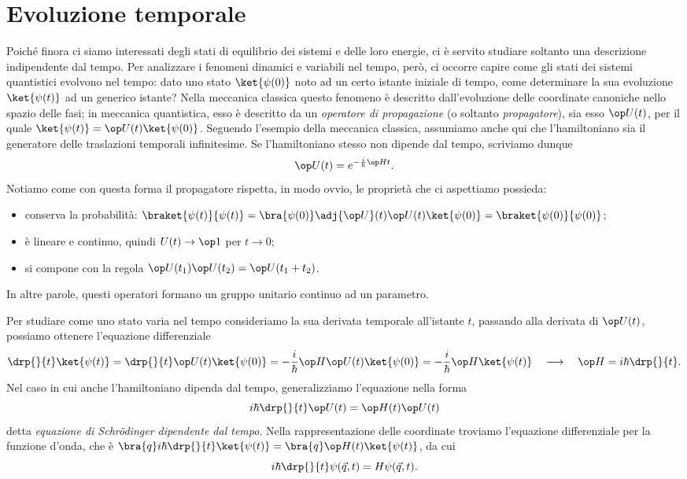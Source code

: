 \chapter{Evoluzione temporale}
Poich\'e finora ci siamo interessati degli stati di equilibrio dei sistemi  e delle loro energie, ci è servito studiare soltanto una descrizione indipendente dal tempo.
Per analizzare i fenomeni dinamici e variabili nel tempo, però, ci occorre capire come gli stati dei sistemi quantistici evolvono nel tempo: dato uno stato $\ket{\psi(0)}$ noto ad un certo istante iniziale di tempo, come determinare la sua evoluzione $\ket{\psi(t)}$ ad un generico istante?
Nella meccanica classica questo fenomeno è descritto dall'evoluzione delle coordinate canoniche nello spazio delle fasi; in meccanica quantistica, esso è descritto da un \emph{operatore di propagazione} (o soltanto \emph{propagatore}), sia esso $\op U(t)$, per il quale $\ket{\psi(t)}=\op U(t)\ket{\psi(0)}$.
Seguendo l'esempio della meccanica classica, assumiamo anche qui che l'hamiltoniano sia il generatore delle traslazioni temporali infinitesime.
Se l'hamiltoniano stesso non dipende dal tempo, scriviamo dunque
\begin{equation}
	\op U(t)=e^{-\frac{i}{\hbar}\op Ht}.
	\label{eq:propagatore}
\end{equation}
Notiamo come con questa forma il propagatore rispetta, in modo ovvio, le proprietà che ci aspettiamo possieda:
\begin{itemize}
	\item conserva la probabilità: $\braket{\psi(t)}{\psi(t)}=\bra{\psi(0)}\adj{\op U}(t)\op U(t)\ket{\psi(0)}=\braket{\psi(0)}{\psi(0)}$;
	\item è lineare e continuo, quindi $U(t)\to\op 1$ per $t\to 0$;
	\item si compone con la regola $\op U(t_1)\op U(t_2)=\op U(t_1+t_2)$.
\end{itemize}
In altre parole, questi operatori formano un gruppo unitario continuo ad un parametro.

Per studiare come uno stato varia nel tempo consideriamo la sua derivata temporale all'istante $t$, passando alla derivata di $\op U(t)$, possiamo ottenere l'equazione differenziale
\begin{equation}
	\drp{}{t}\ket{\psi(t)}=\drp{}{t}\op U(t)\ket{\psi(0)}=-\frac{i}{\hbar}\op H\op U(t)\ket{\psi(0)}=-\frac{i}{\hbar}\op H\ket{\psi(t)}\quad\longrightarrow\quad \op H=i\hbar\drp{}{t}.
\end{equation}
Nel caso in cui anche l'hamiltoniano dipenda dal tempo, generalizziamo l'equazione nella forma
\begin{equation}
	i\hbar\drp{}{t}\op U(t)=\op H(t)\op U(t)
	\label{eq:schrodinger-tempo}
\end{equation}
detta \emph{equazione di Schr\"odinger dipendente dal tempo}.
Nella rappresentazione delle coordinate troviamo l'equazione differenziale per la funzione d'onda, che è $\bra{q}i\hbar\drp{}{t}\ket{\psi(t)}=\bra{q}\op H(t)\ket{\psi(t)}$, da cui
\begin{equation}
	i\hbar\drp{}{t}\psi(\vec q,t)=H\psi(\vec q,t).
	\label{eq:schrodinger-tempo-coordinate}
\end{equation}

